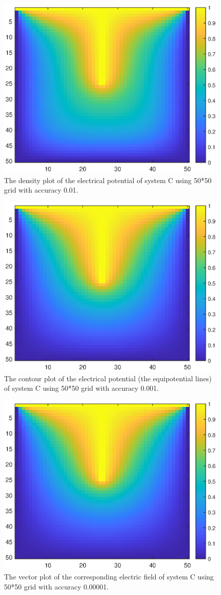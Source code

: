 \documentclass[12pt]{report}
\begin{document}
\begin{figure}[H]
    \centering
    \includegraphics[width=0.8\linewidth]{C001Density.eps}
    \caption{The density plot of the electrical potential of system C using 50*50 grid with accuracy 0.01.}
\end{figure}
\begin{figure}[H]
    \centering
    \includegraphics[width=0.8\linewidth]{C0001Density.eps}
    \caption{The contour plot of the electrical potential (the equipotential lines) of system C using 50*50 grid with accuracy 0.001.}
\end{figure}
\begin{figure}[H]
    \centering
    \includegraphics[width=0.8\linewidth]{C000001Density.eps}
    \caption{The vector plot of the corresponding electric field of system C using 50*50 grid with accuracy 0.00001.}
\end{figure}
\end{document}
